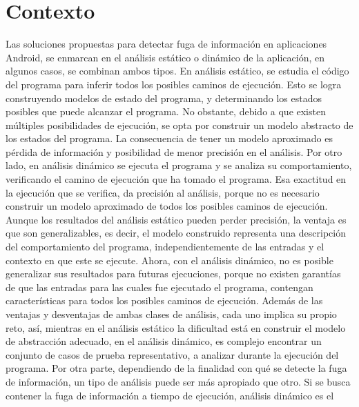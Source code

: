 \section{Contexto}
\label{sec:contexto}
Las soluciones propuestas para detectar fuga de información en aplicaciones
Android, se enmarcan en el análisis estático o dinámico de la aplicación, en
algunos casos, se combinan ambos tipos.\newline 
En análisis estático, se estudia el código del programa para inferir todos
los posibles caminos de ejecución. Esto se logra construyendo modelos de estado
del programa, y determinando los estados posibles que puede alcanzar el
programa.
No obstante, debido a que existen múltiples posibilidades de ejecución, se opta
por construir un modelo abstracto de los estados del programa. La consecuencia
de tener un modelo aproximado es pérdida de información y posibilidad de menor
precisión en el análisis.\newline 
Por otro lado, en análisis dinámico se ejecuta el programa y se analiza su
comportamiento, verificando el camino de ejecución que ha tomado el programa.
Esa exactitud en la ejecución que se verifica, da precisión al análisis, porque
no es necesario construir un modelo aproximado de todos los posibles caminos de
ejecución.\newline 
Aunque los resultados del análisis estático pueden perder precisión, la ventaja
es que son generalizables, es decir, el modelo construido representa una
descripción del comportamiento del programa, independientemente de las entradas
y el contexto en que este se ejecute. Ahora, con el análisis dinámico, no es
posible generalizar sus resultados para futuras ejecuciones, porque no
existen garantías de que las entradas para las cuales fue ejecutado el programa,
contengan características para todos los posibles caminos de ejecución.\newline 
Además de las ventajas y desventajas de ambas clases de análisis, cada uno
implica su propio reto, así, mientras en el análisis estático la dificultad está
en construir el modelo de abstracción adecuado, en el análisis dinámico, es
complejo encontrar un conjunto de casos de prueba representativo, a analizar
durante la ejecución del programa.\newline
Por otra parte, dependiendo de la finalidad con qué se detecte la fuga de
información, un tipo de análisis puede ser más apropiado que otro. Si se busca
contener la fuga de información a tiempo de ejecución, análisis dinámico es el
